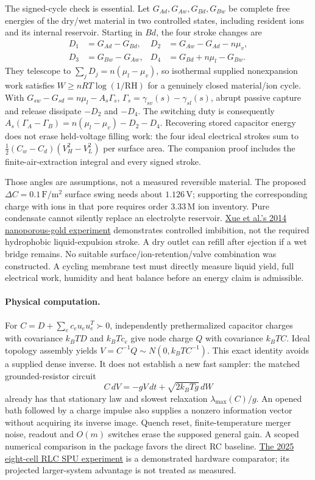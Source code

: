\documentclass[11pt]{article}
\begin{document}
The signed-cycle check is essential. Let $G_{Ad},G_{Aw},G_{Bd},G_{Bw}$ be complete free energies of the dry/wet material in two controlled states, including resident ions and its internal reservoir. Starting in $Bd$, the four stroke changes are
\begin{align*}
 D_1&=G_{Ad}-G_{Bd},&
 D_2&=G_{Aw}-G_{Ad}-n\mu_v,\\
 D_3&=G_{Bw}-G_{Aw},&
 D_4&=G_{Bd}+n\mu_l-G_{Bw}.
\end{align*}
They telescope to $\sum_jD_j=n(\mu_l-\mu_v)$, so isothermal supplied nonexpansion work satisfies $W\ge nRT\log(1/\mathrm{RH})$ for a genuinely closed material/ion cycle. With $G_{sw}-G_{sd}=n\mu_l-A_s\Gamma_s$, $\Gamma_s=\gamma_{sv}(s)-\gamma_{sl}(s)$, abrupt passive capture and release dissipate $-D_2$ and $-D_4$. The switching duty is consequently $A_s(\Gamma_A-\Gamma_B)=n(\mu_l-\mu_v)-D_2-D_4$. Recovering stored capacitor energy does not erase held-voltage filling work: the four ideal electrical strokes sum to $\tfrac12(C_w-C_d)(V_H^2-V_L^2)$ per surface area. The companion proof includes the finite-air-extraction integral and every signed stroke.

Those angles are assumptions, not a measured reversible material. The proposed $\Delta C=0.1\,\mathrm{F/m^2}$ surface swing needs about $1.126\,\mathrm V$; supporting the corresponding charge with ions in that pore requires order $3.33\,\mathrm M$ ion inventory. Pure condensate cannot silently replace an electrolyte reservoir. \href{https://www.nature.com/articles/ncomms5237}{Xue et al.'s 2014 nanoporous-gold experiment} demonstrates controlled imbibition, not the required hydrophobic liquid-expulsion stroke. A dry outlet can refill after ejection if a wet bridge remains. No suitable surface/ion-retention/valve combination was constructed. A cycling membrane test must directly measure liquid yield, full electrical work, humidity and heat balance before an energy claim is admissible.

\paragraph{Physical computation.}
For $C=D+\sum_e c_eu_eu_e^T\succ0$, independently prethermalized capacitor charges with covariance $k_BT D$ and $k_BT c_e$ give node charge $Q$ with covariance $k_BT C$. Ideal topology assembly yields $V=C^{-1}Q\sim N(0,k_BT C^{-1})$. This exact identity avoids a supplied dense inverse. It does not establish a new fast sampler: the matched grounded-resistor circuit
\[
 C\,dV=-gV\,dt+\sqrt{2k_BTg}\,dW
\]
already has that stationary law and slowest relaxation $\lambda_{\max}(C)/g$. An opened bath followed by a charge impulse also supplies a nonzero information vector without acquiring its inverse image. Quench reset, finite-temperature merger noise, readout and $O(m)$ switches erase the supposed general gain. A scoped numerical comparison in the package favors the direct RC baseline. \href{https://www.nature.com/articles/s41467-025-59011-x}{The 2025 eight-cell RLC SPU experiment} is a demonstrated hardware comparator; its projected larger-system advantage is not treated as measured.
\end{document}
